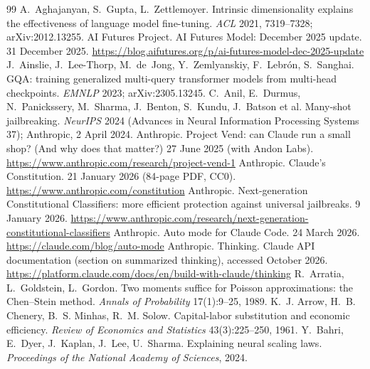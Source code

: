 \begin{thebibliography}{99}
\small
{} A.~Aghajanyan, S.~Gupta, L.~Zettlemoyer. Intrinsic dimensionality explains the effectiveness of language model fine-tuning. \emph{ACL} 2021, 7319--7328; arXiv:2012.13255.
 AI Futures Project. AI Futures Model: December 2025 update. 31 December 2025. \url{https://blog.aifutures.org/p/ai-futures-model-dec-2025-update}
 J.~Ainslie, J.~Lee-Thorp, M.~de~Jong, Y.~Zemlyanskiy, F.~Lebr{\'o}n, S.~Sanghai. GQA: training generalized multi-query transformer models from multi-head checkpoints. \emph{EMNLP} 2023; arXiv:2305.13245.
 C.~Anil, E.~Durmus, N.~Panickssery, M.~Sharma, J.~Benton, S.~Kundu, J.~Batson et al. Many-shot jailbreaking. \emph{NeurIPS} 2024 (Advances in Neural Information Processing Systems 37); Anthropic, 2 April 2024.
 Anthropic. Project Vend: can Claude run a small shop? (And why does that matter?) 27 June 2025 (with Andon Labs). \url{https://www.anthropic.com/research/project-vend-1}
 Anthropic. Claude's Constitution. 21 January 2026 (84-page PDF, CC0). \url{https://www.anthropic.com/constitution}
 Anthropic. Next-generation Constitutional Classifiers: more efficient protection against universal jailbreaks. 9 January 2026. \url{https://www.anthropic.com/research/next-generation-constitutional-classifiers}
 Anthropic. Auto mode for Claude Code. 24 March 2026. \url{https://claude.com/blog/auto-mode}
 Anthropic. Thinking. Claude API documentation (section on summarized thinking), accessed October 2026. \url{https://platform.claude.com/docs/en/build-with-claude/thinking}
 R.~Arratia, L.~Goldstein, L.~Gordon. Two moments suffice for Poisson approximations: the Chen--Stein method. \emph{Annals of Probability} 17(1):9--25, 1989.
 K.~J. Arrow, H.~B. Chenery, B.~S. Minhas, R.~M. Solow. Capital-labor substitution and economic efficiency. \emph{Review of Economics and Statistics} 43(3):225--250, 1961.
 Y.~Bahri, E.~Dyer, J.~Kaplan, J.~Lee, U.~Sharma. Explaining neural scaling laws. \emph{Proceedings of the National Academy of Sciences}, 2024.

\end{thebibliography}
